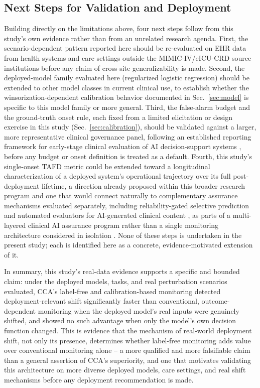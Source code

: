 \documentclass[preprintsapa,article,submit,oneauthor]{Definitions/mdpi}
\begin{document}
\subsection{Next Steps for Validation and Deployment}\label{sec:disc-nextsteps}

Building directly on the limitations above, four next steps follow from this study's own evidence rather than from an unrelated research agenda. First, the scenario-dependent pattern reported here should be re-evaluated on EHR data from health systems and care settings outside the MIMIC-IV/eICU-CRD source institutions before any claim of cross-site generalizability is made. Second, the deployed-model family evaluated here (regularized logistic regression) should be extended to other model classes in current clinical use, to establish whether the winsorization-dependent calibration behavior documented in Sec.~\ref{sec:model} is specific to this model family or more general. Third, the false-alarm budget and the ground-truth onset rule, each fixed from a limited elicitation or design exercise in this study (Sec.~\ref{sec:calibration}), should be validated against a larger, more representative clinical governance panel, following an established reporting framework for early-stage clinical evaluation of AI decision-support systems \citep{vasey2022}, before any budget or onset definition is treated as a default. Fourth, this study's single-onset TAFD metric could be extended toward a longitudinal characterization of a deployed system's operational trajectory over its full post-deployment lifetime, a direction already proposed within this broader research program \citep{yu2026predictability} and one that would connect naturally to complementary assurance mechanisms evaluated separately, including reliability-gated selective prediction \citep{yu2026deferral} and automated evaluators for AI-generated clinical content \citep{collaco2026llmjudge}, as parts of a multi-layered clinical AI assurance program rather than a single monitoring architecture considered in isolation \citep{yu2026assurancegovernance,yu2026monitoring}. None of these steps is undertaken in the present study; each is identified here as a concrete, evidence-motivated extension of it.

In summary, this study's real-data evidence supports a specific and bounded claim: under the deployed models, tasks, and real perturbation scenarios evaluated, CCA's label-free and calibration-based monitoring detected deployment-relevant shift significantly faster than conventional, outcome-dependent monitoring when the deployed model's real inputs were genuinely shifted, and showed no such advantage when only the model's own decision function changed. This is evidence that the mechanism of real-world deployment shift, not only its presence, determines whether label-free monitoring adds value over conventional monitoring alone -- a more qualified and more falsifiable claim than a general assertion of CCA's superiority, and one that motivates validating this architecture on more diverse deployed models, care settings, and real shift mechanisms before any deployment recommendation is made.
\end{document}
